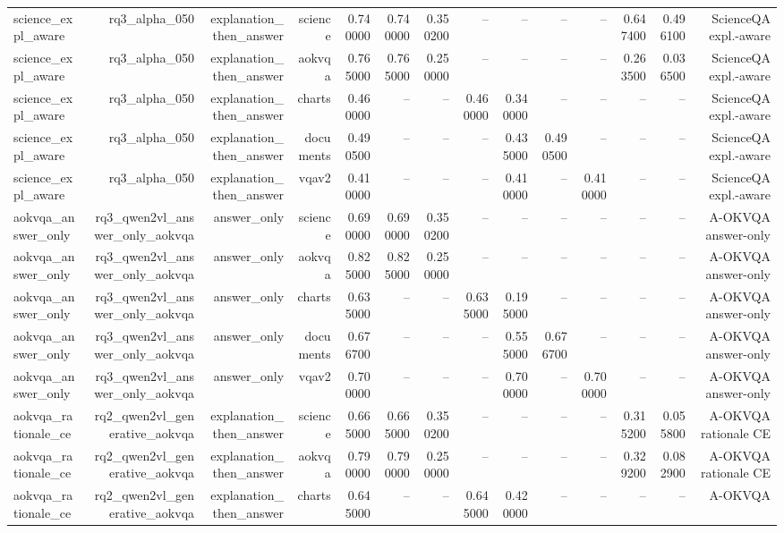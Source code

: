 \begin{table}
\begin{tabular}{lrrrrrrrrrrrrr}
science_expl_aware & rq3_alpha_050 & explanation_then_answer & science & 0.740000 & 0.740000 & 0.350200 & -- & -- & -- & -- & 0.647400 & 0.496100 & ScienceQA
expl.-aware \\
science_expl_aware & rq3_alpha_050 & explanation_then_answer & aokvqa & 0.765000 & 0.765000 & 0.250000 & -- & -- & -- & -- & 0.263500 & 0.036500 & ScienceQA
expl.-aware \\
science_expl_aware & rq3_alpha_050 & explanation_then_answer & charts & 0.460000 & -- & -- & 0.460000 & 0.340000 & -- & -- & -- & -- & ScienceQA
expl.-aware \\
science_expl_aware & rq3_alpha_050 & explanation_then_answer & documents & 0.490500 & -- & -- & -- & 0.435000 & 0.490500 & -- & -- & -- & ScienceQA
expl.-aware \\
science_expl_aware & rq3_alpha_050 & explanation_then_answer & vqav2 & 0.410000 & -- & -- & -- & 0.410000 & -- & 0.410000 & -- & -- & ScienceQA
expl.-aware \\
aokvqa_answer_only & rq3_qwen2vl_answer_only_aokvqa & answer_only & science & 0.690000 & 0.690000 & 0.350200 & -- & -- & -- & -- & -- & -- & A-OKVQA
answer-only \\
aokvqa_answer_only & rq3_qwen2vl_answer_only_aokvqa & answer_only & aokvqa & 0.825000 & 0.825000 & 0.250000 & -- & -- & -- & -- & -- & -- & A-OKVQA
answer-only \\
aokvqa_answer_only & rq3_qwen2vl_answer_only_aokvqa & answer_only & charts & 0.635000 & -- & -- & 0.635000 & 0.195000 & -- & -- & -- & -- & A-OKVQA
answer-only \\
aokvqa_answer_only & rq3_qwen2vl_answer_only_aokvqa & answer_only & documents & 0.676700 & -- & -- & -- & 0.555000 & 0.676700 & -- & -- & -- & A-OKVQA
answer-only \\
aokvqa_answer_only & rq3_qwen2vl_answer_only_aokvqa & answer_only & vqav2 & 0.700000 & -- & -- & -- & 0.700000 & -- & 0.700000 & -- & -- & A-OKVQA
answer-only \\
aokvqa_rationale_ce & rq2_qwen2vl_generative_aokvqa & explanation_then_answer & science & 0.665000 & 0.665000 & 0.350200 & -- & -- & -- & -- & 0.315200 & 0.055800 & A-OKVQA
rationale CE \\
aokvqa_rationale_ce & rq2_qwen2vl_generative_aokvqa & explanation_then_answer & aokvqa & 0.790000 & 0.790000 & 0.250000 & -- & -- & -- & -- & 0.329200 & 0.082900 & A-OKVQA
rationale CE \\
aokvqa_rationale_ce & rq2_qwen2vl_generative_aokvqa & explanation_then_answer & charts & 0.645000 & -- & -- & 0.645000 & 0.420000 & -- & -- & -- & -- & A-OKVQA

\end{tabular}
\end{table}
